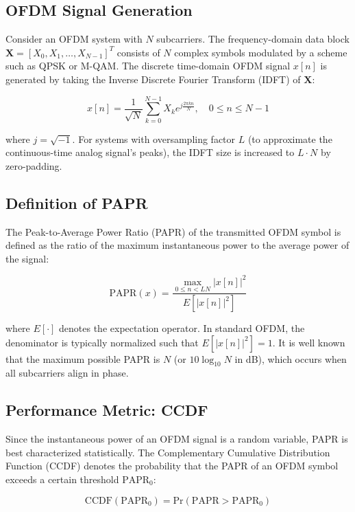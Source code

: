 \documentclass[conference]{IEEEtran}
\begin{document}
\subsection{OFDM Signal Generation}
Consider an OFDM system with $N$ subcarriers. The frequency-domain data block $\mathbf{X} = [X_0, X_1, \dots, X_{N-1}]^T$ consists of $N$ complex symbols modulated by a scheme such as QPSK or M-QAM. The discrete time-domain OFDM signal $x[n]$ is generated by taking the Inverse Discrete Fourier Transform (IDFT) of $\mathbf{X}$:

\begin{equation}
    x[n] = \frac{1}{\sqrt{N}} \sum_{k=0}^{N-1} X_k e^{j \frac{2\pi k n}{N}}, \quad 0 \le n \le N-1
\end{equation}

where $j = \sqrt{-1}$. For systems with oversampling factor $L$ (to approximate the continuous-time analog signal's peaks), the IDFT size is increased to $L \cdot N$ by zero-padding.

\subsection{Definition of PAPR}
The Peak-to-Average Power Ratio (PAPR) of the transmitted OFDM symbol is defined as the ratio of the maximum instantaneous power to the average power of the signal:

\begin{equation}
    \text{PAPR}(x) = \frac{\max_{0 \le n < LN} |x[n]|^2}{E[|x[n]|^2]}
\end{equation}

where $E[\cdot]$ denotes the expectation operator. In standard OFDM, the denominator is typically normalized such that $E[|x[n]|^2] = 1$. It is well known that the maximum possible PAPR is $N$ (or $10 \log_{10} N$ in dB), which occurs when all subcarriers align in phase.

\subsection{Performance Metric: CCDF}
Since the instantaneous power of an OFDM signal is a random variable, PAPR is best characterized statistically. The Complementary Cumulative Distribution Function (CCDF) denotes the probability that the PAPR of an OFDM symbol exceeds a certain threshold $\text{PAPR}_0$:

\begin{equation}
    \text{CCDF}(\text{PAPR}_0) = \text{Pr}(\text{PAPR} > \text{PAPR}_0)
\end{equation}
\end{document}
